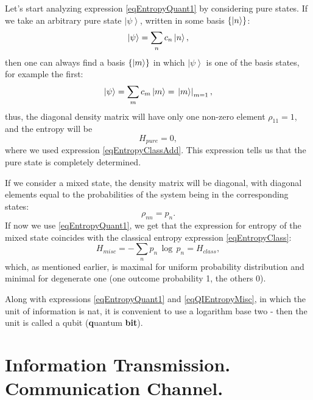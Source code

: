 Let's start analyzing expression \eqref{eqEntropyQuant1} by considering pure states.
If we take an arbitrary pure state $\left|\psi\right>$,
written in some basis $\left\{\ket{n}\right\}$:
\[
\left|\psi\right> = \sum_n c_n \ket{n},
\]
then one can always find a basis $\left\{\ket{m}\right\}$ in
which $\left|\psi\right>$ is one of the basis states, for example the first: 
\[
\left|\psi\right> = \sum_m c_m \ket{m} = 
\left.\ket{m}\right|_{m = 1},
\]
thus, the diagonal density matrix will have only one
non-zero element $\rho_{11} = 1$, and the entropy will be
\begin{equation}
H_{pure} = 0,
\label{eqQIEntropyPure}
\end{equation}
where we used expression \eqref{eqEntropyClassAdd}. This
expression tells us that the pure state 
 is completely
determined. 

If we consider a mixed state,
 the density matrix
will be diagonal, with
diagonal elements equal to
the probabilities of the system being in the corresponding states:
\[
\rho_{nn} = p_n.
\]
If now we use \eqref{eqEntropyQuant1}, we get
that the expression for entropy of the mixed state coincides with
the classical entropy expression \eqref{eqEntropyClass}:
\begin{equation}
H_{misc} = - \sum_n p_n \, \log \, p_n = H_{class},
\label{eqQIEntropyMisc}
\end{equation}
which, as mentioned earlier, is maximal for uniform probability distribution
and minimal for degenerate one (one outcome probability 1, the others 0).


Along with expressions \eqref{eqEntropyQuant1} and \eqref{eqQIEntropyMisc},
in which the unit of information is nat, it is convenient
to use a logarithm base two - then the unit
is called a qubit ({\bf q}uantum {\bf bit}).

\section{Information Transmission. Communication Channel.}

